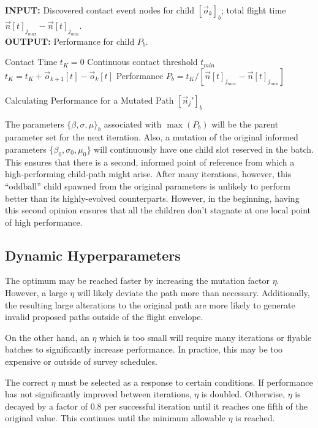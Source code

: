 \documentclass[conf]{new-aiaa}
\begin{document}
\begin{algorithm}
\textbf{INPUT:} Discovered contact event nodes for child $\left[\vec{o}_k\right]_b$; total flight time $\vec{n}[t]_{j_{max}} - \vec{n}[t]_{j_{min}}$.\\
\textbf{OUTPUT:} Performance for child $P_b$.
\begin{algorithmic}
\STATE Contact Time $t_K = 0$
\STATE Continuous contact threshold $t_{min}$
\STATE $t_K = t_K + \vec{o}_{k + 1}[t] - \vec{o}_k[t]$
\ENDIF
\ENDFOR
\STATE Performance $P_b = t_K/\left[\vec{n}[t]_{j_{max}} - \vec{n}[t]_{j_{min}}\right]$
\end{algorithmic}
\caption{Calculating Performance for a Mutated Path $\left[\vec{n}_j'\right]_b$}
\label{find-contact-time}
\end{algorithm}

The parameters ${\{\beta, \sigma, \mu\}}_b$ associated with $\max({P_b})$ will be the parent parameter set for the next iteration. Also, a mutation of the original informed parameters $\{\beta_0, \sigma_0, \mu_0\}$ will continuously have one child slot reserved in the batch. This ensures that there is a second, informed point of reference from which a high-performing child-path might arise. After many iterations, however, this ``oddball'' child spawned from the original parameters is unlikely to perform better than its highly-evolved counterparts. However, in the beginning, having this second opinion ensures that all the children don't stagnate at one local point of high performance.


\subsection{Dynamic Hyperparameters}
The optimum may be reached faster by increasing the mutation factor $\eta$. However, a large $\eta$ will likely deviate the path more than necessary. Additionally, the resulting large alterations to the original path are more likely to generate invalid proposed paths outside of the flight envelope.

On the other hand, an $\eta$ which is too small will require many iterations or flyable batches to significantly increase performance. In practice, this may be too expensive or outside of survey schedules.

The correct $\eta$ must be selected as a response to certain conditions. If performance has not significantly improved between iterations, $\eta$ is doubled. Otherwise, $\eta$ is decayed by a factor of 0.8 per successful iteration until it reaches one fifth of the original value. This continues until the minimum allowable $\eta$ is reached.
\end{document}
